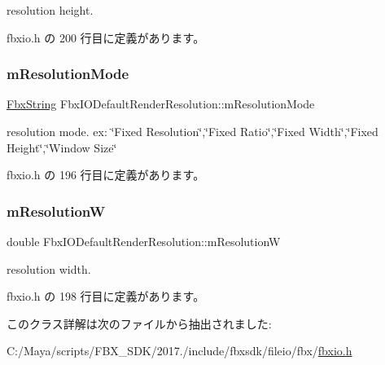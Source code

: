 resolution height. 

 fbxio.\+h の 200 行目に定義があります。

\mbox{\label{class_fbx_i_o_default_render_resolution_a9c5e1f0ab623fe67690f95517665ebca}} 
\subsubsection{\texorpdfstring{m\+Resolution\+Mode}{mResolutionMode}}
{\footnotesize\ttfamily \hyperlink{class_fbx_string}{Fbx\+String} Fbx\+I\+O\+Default\+Render\+Resolution\+::m\+Resolution\+Mode}

resolution mode. ex\+: \char`\"{}\+Fixed Resolution\char`\"{},\char`\"{}\+Fixed Ratio\char`\"{},\char`\"{}\+Fixed Width\char`\"{},\char`\"{}\+Fixed Height\char`\"{},\char`\"{}\+Window Size\char`\"{} 

 fbxio.\+h の 196 行目に定義があります。

\mbox{\label{class_fbx_i_o_default_render_resolution_a1d437196200a13c117228782e95102bd}} 
\subsubsection{\texorpdfstring{m\+ResolutionW}{mResolutionW}}
{\footnotesize\ttfamily double Fbx\+I\+O\+Default\+Render\+Resolution\+::m\+ResolutionW}

resolution width. 

 fbxio.\+h の 198 行目に定義があります。



このクラス詳解は次のファイルから抽出されました\+:\begin{DoxyCompactItemize}
\item 
C\+:/\+Maya/scripts/\+F\+B\+X\+\_\+\+S\+D\+K/2017./include/fbxsdk/fileio/fbx/\hyperlink{fbxio_8h}{fbxio.\+h}\end{DoxyCompactItemize}
